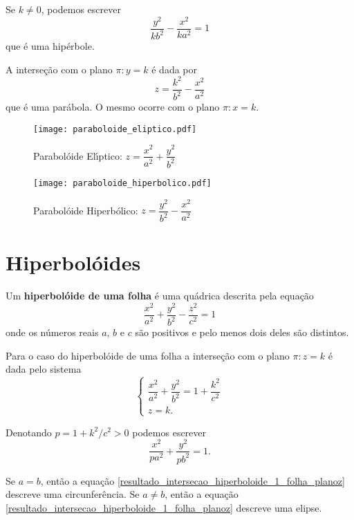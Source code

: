 Se $k \ne 0$, podemos escrever
\[
	\dfrac{y^2}{kb^2} - \dfrac{x^2}{ka^2} = 1
\]
que \'e uma hip\'erbole.

A interse\c{c}\~ao com o plano $\pi : y = k$ \'e dada por
\[
	z = \dfrac{k^2}{b^2} - \dfrac{x^2}{a^2}
\]
que \'e uma par\'abola. O mesmo ocorre com o plano $\pi : x = k$.


\begin{figure}[h]
	\centering
	\caption{Parabol\'oide El{\'\i}ptico: $z = \dfrac{x^2}{a^2} + \dfrac{y^2}{b^2}$}
	\texttt{[image: paraboloide\_eliptico.pdf]}
\end{figure}

\begin{figure}[h]
	\centering
	\caption{Parabol\'oide Hiperb\'olico: $z = \dfrac{y^2}{b^2} - \dfrac{x^2}{a^2}$}
	\texttt{[image: paraboloide\_hiperbolico.pdf]}
\end{figure}

\section{Hiperbol\'oides} %
\label{sec:hiperboloide}
\begin{definicao}
	Um \textbf{hiperbol\'oide de uma folha} \'e uma qu\'adrica descrita pela equa\c{c}\~ao
	\[
		\dfrac{x^2}{a^2} + \dfrac{y^2}{b^2} - \dfrac{z^2}{c^2} = 1
	\]
	onde os n\'umeros reais $a$, $b$ e $c$ s\~ao positivos e pelo menos dois deles s\~ao distintos.
\end{definicao}

Para o caso do hiperbol\'oide de uma folha a interse\c{c}\~ao com o plano $\pi : z = k$ \'e dada pelo sistema
\[
	\begin{cases}
		\dfrac{x^2}{a^2} + \dfrac{y^2}{b^2} = 1 + \dfrac{k^2}{c^2}\\
		z = k.
	\end{cases}
\]

Denotando $p = 1 + k^2/c^2 > 0$ podemos escrever
\begin{equation}\label{resultado_intersecao_hiperboloide_1_folha_planoz}
	\dfrac{x^2}{pa^2} + \dfrac{y^2}{pb^2} = 1.
\end{equation}

Se $a = b$, ent\~ao a equa\c{c}\~ao \eqref{resultado_intersecao_hiperboloide_1_folha_planoz} descreve uma circunfer\^encia. Se $a \ne b$, ent\~ao a equa\c{c}\~ao \eqref{resultado_intersecao_hiperboloide_1_folha_planoz} descreve uma elipse.

